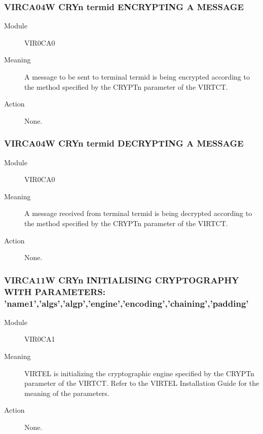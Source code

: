 \documentclass[letterpaper,10pt,english]{sphinxmanual}
\begin{document}
\subsubsection{VIRCA04W CRYn termid ENCRYPTING A MESSAGE}
\label{\detokenize{messages:virca04w-cryn-termid-encrypting-a-message}}\begin{description}
\item[{Module}] \leavevmode
VIR0CA0

\item[{Meaning}] \leavevmode
A message to be sent to terminal termid is being encrypted according to the method specified by the CRYPTn parameter of the VIRTCT.

\item[{Action}] \leavevmode
None.

\end{description}


\subsubsection{VIRCA04W CRYn termid DECRYPTING A MESSAGE}
\label{\detokenize{messages:virca04w-cryn-termid-decrypting-a-message}}\begin{description}
\item[{Module}] \leavevmode
VIR0CA0

\item[{Meaning}] \leavevmode
A message received from terminal termid is being decrypted according to the method specified by the CRYPTn parameter of the VIRTCT.

\item[{Action}] \leavevmode
None.

\end{description}


\subsubsection{VIRCA11W CRYn INITIALISING CRYPTOGRAPHY WITH PARAMETERS: ’name1’,’algs’,’algp’,’engine’,’encoding’,’chaining’,’padding’}
\label{\detokenize{messages:virca11w-cryn-initialising-cryptography-with-parameters-name1-algs-algp-engine-encoding-chaining-padding}}\begin{description}
\item[{Module}] \leavevmode
VIR0CA1

\item[{Meaning}] \leavevmode
VIRTEL is initializing the cryptographic engine specified by the CRYPTn parameter of the VIRTCT. Refer to the VIRTEL Installation Guide for the meaning of the parameters.

\item[{Action}] \leavevmode
None.

\end{description}
\end{document}
